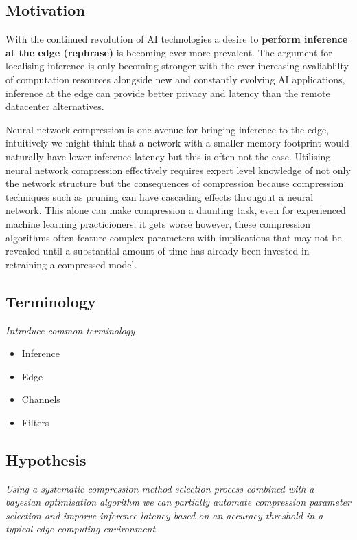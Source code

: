 \documentclass[../Dissertation.tex]{subfiles}
\begin{document}
\subsection{Motivation}
With the continued revolution of AI technologies a desire to \textbf{perform inference at the edge (rephrase)} is becoming ever more prevalent.
The argument for localising inference is only becoming stronger with the ever increasing avaliablilty of computation resources alongside new and constantly evolving AI applications, inference at the edge can provide better privacy and latency than the remote datacenter alternatives.


Neural network compression is one avenue for bringing inference to the edge, intuitively we might think that a network with a smaller memory footprint would naturally have lower inference latency but this is often not the case.
Utilising neural network compression effectively requires expert level knowledge of not only the network structure but the consequences of compression because compression techniques such as pruning can have cascading effects througout a neural network.
This alone can make compression a daunting task, even for experienced machine learning practicioners, it gets worse however, these compression algorithms often feature complex parameters with implications that may not be revealed until a substantial amount of time has already been invested in retraining a compressed model.

\subsection{Terminology}
\emph{Introduce common terminology}


\begin{itemize}
    \item Inference
    \item Edge
    \item Channels
    \item Filters
\end{itemize}

\subsection{Hypothesis}
\emph{Using a systematic compression method selection process combined with a bayesian optimisation algorithm we can partially automate compression parameter selection and imporve inference latency based on an accuracy threshold in a typical edge computing environment.}
\end{document}
